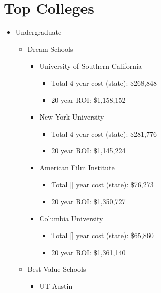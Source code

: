 \section{Top Colleges}
\begin{itemize}
    \item{Undergraduate} 
    \begin{itemize}
        \item{Dream Schools}
            \begin{itemize}
                \item{University of Southern California}
                    \begin{itemize}
                        \item{Total 4 year cost (state):} \$268,848 
                        \item{20 year ROI:} \$1,158,152 
                    \end{itemize}
                \item{New York University}
                    \begin{itemize}
                        \item{Total 4 year cost (state):} \$281,776 
                        \item{20 year ROI:} \$1,145,224
                    \end{itemize}
                \item{American Film Institute}
                    \begin{itemize}
                        \item{Total [] year cost (state):} \$76,273 
                        \item{20 year ROI:} \$1,350,727
                    \end{itemize}
                \item{Columbia University}
                    \begin{itemize}
                        \item{Total [] year cost (state):} \$65,860
                        \item{20 year ROI:} \$1,361,140 
                    \end{itemize}
            \end{itemize}
        \item{Best Value Schools} 
            \begin{itemize}
                \item{UT Austin}
                    \begin{itemize}

\end{itemize}
\end{itemize}
\end{itemize}
\end{itemize}
